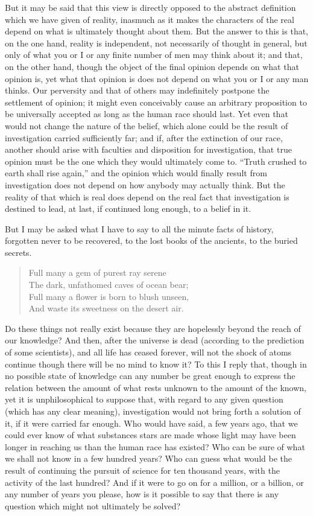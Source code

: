 \documentclass[]{article}
\begin{document}
But it may be said that this view is directly opposed to the abstract  definition which we have given of reality, inasmuch as it makes the characters of the real depend on what is ultimately thought about them. But the answer to this is that, on the one hand, reality is independent, not necessarily of thought in general, but only of what you or I or any finite number of men may think about it; and that, on the other hand, though the
object of the final opinion depends on what that opinion is, yet what that opinion is does not depend on what you or I or any man thinks. Our perversity and that of others may indefinitely postpone the settlement of opinion; it
might even conceivably cause an arbitrary proposition to be universally accepted as long as the human race should last. Yet even that would not change the nature of the belief, which alone could be the result of investigation
carried sufficiently far; and if, after the extinction of our race, another should arise with faculties and disposition for investigation, that true opinion must be the one which they would ultimately come to. ``Truth crushed to
earth shall rise again,'' and the opinion which would finally result from investigation does not depend on how anybody may actually think. But the reality of that which is real does depend on the real fact that investigation
is destined to lead, at last, if continued long enough, to a belief in it. 



But I may be asked what I have to say to all the minute facts of history, forgotten never to be recovered, to the lost books of the ancients, to the buried secrets.
\begin{quote}
Full many a gem of purest ray serene\\
The dark, unfathomed caves of ocean bear;\\
Full many a flower is born to blush unseen,\\
And waste its sweetness on the desert air.
\end{quote}
Do these things not really exist because they are hopelessly beyond the reach of our knowledge? And then, after the universe is dead (according to the prediction of some scientists), and all life has ceased forever, will not the shock of atoms continue though there will be no mind to know it? To this I reply that, though in no possible state of knowledge can any number be great enough to express the relation between the amount of what rests unknown to the amount of the known, yet it is unphilosophical to suppose that, with regard to any given question (which has any clear meaning), investigation would not bring forth a solution of it, if it were carried far enough. Who would have said, a few years ago, that we could ever know of what substances stars are made whose light may have been longer in reaching us than the human race has existed? Who can be sure of  what we shall not know in a few hundred years? Who can guess what would be the result of continuing the pursuit of science for ten thousand years, with the activity of the last hundred? And if it were to go on for a million, or a billion, or any number of years you please, how is it possible to say that there is any question which might not ultimately be solved?
\end{document}

